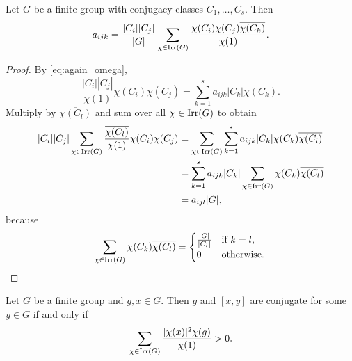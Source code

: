 \begin{theorem}[Burnside]
    Let $G$ be a finite group with conjugacy classes $C_1,\dots,C_s$. 
    Then
    \[
    a_{ijk}
    =\frac{|C_i||C_j|}{|G|}
    \sum_{\chi\in\operatorname{Irr}(G)}\frac{\chi(C_i)\chi(C_j)\overline{\chi(C_k)}}{\chi(1)}.
    \]
\end{theorem}

\begin{proof}
    By \eqref{eq:again_omega}, 
    \[
    \frac{|C_i||C_j|}{\chi(1)}\chi(C_i)\chi(C_j)
    =\sum_{k=1}^sa_{ijk}|C_k|\chi(C_k).
    \]
    Multiply by $\overline{\chi(C_l)}$ and sum over all
    $\chi\in\operatorname{Irr}(G)$ to obtain 
    \begin{align*}
    |C_i||C_j|\sum_{\chi\in\operatorname{Irr}(G)}\frac{\overline{\chi(C_l)}}{\chi(1)}\chi(C_i)\chi(C_j)
    &=\sum_{\chi\in\operatorname{Irr}(G)}\sum_{k=1}^sa_{ijk}|C_k|\chi(C_k)\overline{\chi(C_l)}\\
    &=\sum_{k=1}^sa_{ijk}|C_k|\sum_{\chi\in\operatorname{Irr}(G)}\chi(C_k)\overline{\chi(C_l)}\\
    &=a_{ijl}|G|,
    \end{align*}
    because 
    \[
    \sum_{\chi\in\operatorname{Irr}(G)}\chi(C_k)\overline{\chi(C_l)}=\begin{cases}
        \frac{|G|}{|C_l|} & \text{if $k=l$},\\
        0 & \text{otherwise}.
        \end{cases}\qedhere
    \]
\end{proof}

\begin{theorem}[Burnside]
    Let $G$ be a finite group and $g,x\in G$. Then
    $g$ and $[x,y]$ are conjugate for some $y\in G$ if and only if
    \[
    \sum_{\chi\in\operatorname{Irr}(G)}\frac{|\chi(x)|^2\chi(g)}{\chi(1)}>0.
    \]
\end{theorem}

